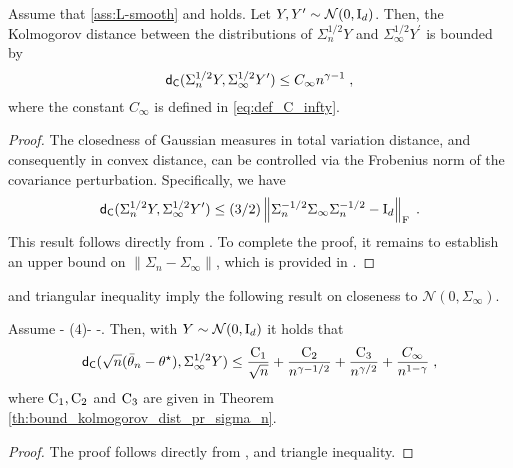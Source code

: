 \begin{lemma}
\label{lem:bound_kolmogorov_dist_sigma_n_sigma_infty}
Assume that \cref{ass:L-smooth} and  holds. Let \( Y, Y^\prime \sim \mathcal{N}(0, \mathrm{I}_d) \). Then, the Kolmogorov distance between the distributions of \( \Sigma_n^{1/2} Y \) and \( \Sigma_\infty^{1/2} Y^\prime \) is bounded by  
\begin{equation}
    \mathsf{d}_{\mathsf{C}} (\Sigma_n^{1/2} Y, \Sigma_\infty^{1/2} Y^\prime) \leq  C_{\infty} n^{\gamma-1} \;,
\end{equation}
where the constant \( C_{\infty} \) is defined in \eqref{eq:def_C_infty}.
\end{lemma}
\begin{proof}
The closedness of Gaussian measures in total variation distance, and consequently in convex distance, can be controlled via the Frobenius norm of the covariance perturbation. Specifically, we have  
\begin{equation}
\label{eq:kolmogorov_}
\mathsf{d}_{\mathsf{C}} (\Sigma_n^{1/2} Y, \Sigma_\infty^{1/2} Y^\prime) \leq (3/2) \left\Vert \Sigma_n^{-1/2} \Sigma_\infty \Sigma_n^{-1/2} - \mathrm{I}_d \right\Vert_{\mathrm{F}} \;.
\end{equation}
This result follows directly from . To complete the proof, it remains to establish an upper bound on \( \|\Sigma_n - \Sigma_\infty\| \), which is provided in .
\end{proof}
 and triangular inequality imply the following result on closeness to $\mathcal{N}(0,\Sigma_{\infty})$. 

\begin{theorem}
\label{cor:berry-esseen}
Assume  - ($4$)- -. Then, with $Y \sim \mathcal{N}(0,\mathrm{I}_d)$ it holds that 
    \begin{equation}
    \label{eq:Berry-Esseen_Bound_Sigma_infty}
        \mathsf{d}_{\mathsf{C}}(\sqrt{n}(\bar\theta_n -\theta^\star), \Sigma_\infty^{1/2} Y)  \leq 
        \frac{\operatorname{C}_1}{\sqrt{n}}   +  \frac{\operatorname{C}_2}{n^{\gamma - 1/2}}+ \frac{\operatorname{C}_{3}}{n^{\gamma/2}} + \frac{C_\infty}{ n^{1 - \gamma}} \;,
   \end{equation}
   where $\operatorname{C}_1, \operatorname{C}_2$ and $\operatorname{C}_3$ are given in Theorem \ref{th:bound_kolmogorov_dist_pr_sigma_n}. 
\end{theorem}
\begin{proof}
    The proof follows directly from ,  and triangle inequality.
\end{proof}

